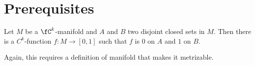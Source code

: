 \section{Prerequisites}
\label{sec:prereq}

\begin{lem}
    Let $M$ be a $\fC^k$-manifold and $A$ and $B$ two disjoint closed sets in $M$. 
    Then there is a $C^k$-function $f \colon M \to [0, 1]$ such that $f$ is $0$ on $A$ and  $1$ on $B$.
\end{lem}

\begin{rem}
    Again, this requires a definition of manifold that makes it metrizable. 
\end{rem}
